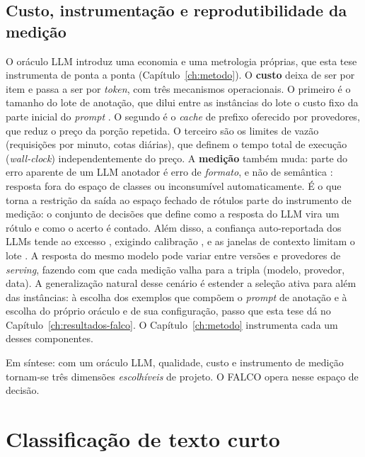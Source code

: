 \subsection{Custo, instrumentação e reprodutibilidade da medição}
\label{sssec:llm_custo}

O oráculo LLM introduz uma economia e uma metrologia próprias, que esta
tese instrumenta de ponta a ponta (Capítulo~\ref{ch:metodo}). O
\textbf{custo} deixa de ser por item e passa a
ser por \emph{token}, com três mecanismos operacionais. O primeiro é o
tamanho do lote de anotação, que dilui entre as instâncias do lote o custo
fixo da parte inicial do \textit{prompt} \citep{Kholodna2024}. O segundo é o
\textit{cache} de prefixo oferecido por provedores, que reduz o preço da
porção repetida. O terceiro são os limites de vazão (requisições por minuto,
cotas diárias), que definem o tempo total de execução (\textit{wall-clock})
independentemente do preço. A \textbf{medição} também muda: parte do erro aparente de um LLM
anotador é erro de \emph{formato}, e não de semântica \citep{Kholodna2024}:
resposta fora do espaço de classes ou inconsumível automaticamente. É o que
torna a restrição da saída ao espaço fechado de rótulos parte do instrumento
de medição: o conjunto de decisões que define como a resposta do LLM vira um
rótulo e como o acerto é contado. Além disso,
a confiança auto-reportada dos LLMs tende ao excesso \citep{Diao2023},
exigindo calibração \citep{Tian2023}, e as janelas de contexto limitam o lote
\citep{Bayer2024ActiveLLM}. A
resposta do mesmo modelo pode variar entre versões e provedores de
\textit{serving}, fazendo com que cada medição valha para a tripla (modelo,
provedor, data). A generalização natural desse cenário é estender a seleção
ativa para além das instâncias: à escolha dos exemplos que compõem o
\textit{prompt} de anotação \citep{Diao2023, Margatina2023, Zhang2023LLMaAA} e
à escolha do próprio oráculo e de sua configuração, passo que esta tese dá no
Capítulo~\ref{ch:resultados-falco}. O Capítulo~\ref{ch:metodo} instrumenta
cada um desses componentes.

Em síntese: com um oráculo LLM, qualidade, custo e instrumento de medição
tornam-se três dimensões \emph{escolhíveis} de projeto. O FALCO opera nesse
espaço de decisão.

\section{Classificação de texto curto}
\label{sec:fund-stc}

